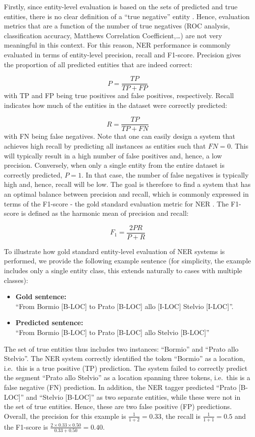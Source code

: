 \documentclass[12pt,a4paper,]{book}
\providecommand{\tightlist}{%
  \setlength{\itemsep}{0pt}\setlength{\parskip}{0pt}}
\begin{document}
Firstly, since entity-level evaluation is based on the sets of predicted and true entities, there is no clear definition of a ``true negative'' entity \citep{esuli2010}. Hence, evaluation metrics that are a function of the number of true negatives (ROC analysis, classification accuracy, Matthews Correlation Coefficient,\ldots{}) are not very meaningful in this context. For this reason, NER performance is commonly evaluated in terms of entity-level precision, recall and F1-score. Precision gives the proportion of all predicted entities that are indeed correct:

\[
P = \frac{TP}{TP + FP}
\]
with TP and FP being true positives and false positives, respectively. Recall indicates how much of the entities in the dataset were correctly predicted:

\[
R = \frac{TP}{TP + FN}
\]
with FN being false negatives. Note that one can easily design a system that achieves high recall by predicting all instances as entities such that \(FN=0\). This will typically result in a high number of false positives and, hence, a low precision. Conversely, when only a single entity from the entire dataset is correctly predicted, \(P=1\). In that case, the number of false negatives is typically high and, hence, recall will be low. The goal is therefore to find a system that has an optimal balance between precision and recall, which is commonly expressed in terms of the F1-score - the gold standard evaluation metric for NER \citep{tjongkimsang2003}. The F1-score is defined as the harmonic mean of precision and recall:

\[
F_1 = \frac{2PR}{P + R}
\]

To illustrate how gold standard entity-level evaluation of NER systems is performed, we provide the following example sentence (for simplicity, the example includes only a single entity class, this extends naturally to cases with multiple classes):

\begin{itemize}
\tightlist
\item
  \textbf{Gold sentence: }\\
  ``From Bormio {[}B-LOC{]} to Prato {[}B-LOC{]} allo {[}I-LOC{]} Stelvio {[}I-LOC{]}''.
\item
  \textbf{Predicted sentence: }\\
  ``From Bormio {[}B-LOC{]} to Prato {[}B-LOC{]} allo Stelvio {[}B-LOC{]}''
\end{itemize}

The set of true entities thus includes two instances: ``Bormio'' and ``Prato allo Stelvio''. The NER system correctly identified the token ``Bormio'' as a location, i.e.~this is a true positive (TP) prediction. The system failed to correctly predict the segment ``Prato allo Stelvio'' as a location spanning three tokens, i.e.~this is a false negative (FN) prediction. In addition, the NER tagger predicted ``Prato {[}B-LOC{]}'' and ``Stelvio {[}B-LOC{]}'' as two separate entities, while these were not in the set of true entities. Hence, these are two false positive (FP) predictions. Overall, the precision for this example is \(\frac{1}{1+2} = 0.33\), the recall is \(\frac{1}{1 + 1} = 0.5\) and the F1-score is \(\frac{2 \times 0.33 \times 0.50}{0.33 + 0.50} = 0.40\).
\end{document}
